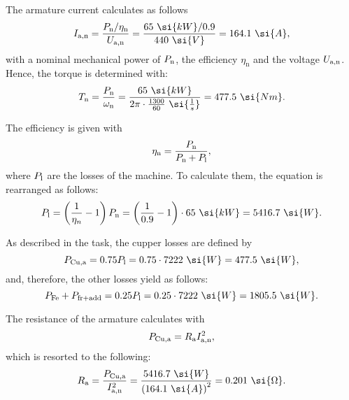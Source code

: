 \begin{solutionblock}
    The armature current calculates as follows
    \begin{equation}
        I_{\mathrm{a,n}} = \frac{\Pn / \eta_{\mathrm{n}}}{\Uan}
        = \frac{65 \ \si{kW} / 0.9}{440 \ \si{V}}
        = 164.1 \ \si{A},
    \end{equation}
    with a nominal mechanical power of $P_{\mathrm{n}}$, the efficiency $\eta_{\mathrm{n}}$ and the voltage $U_{\mathrm{a,n}}$.
    Hence, the torque is determined with:
    \begin{equation}
        \Tn = \frac{\Pn}{\omega_{\mathrm{n}}} 
        = \frac{65 \ \si{kW}}{2 \pi \cdot \frac{1300}{60} \ \si{\frac{1}{s}}}
        = 477.5 \ \si{Nm}.
    \end{equation}

    The efficiency is given with
    \begin{equation}
        \eta_{\mathrm{n}} = \frac{P_{\mathrm{n}}}{P_{\mathrm{n}} + P_{\mathrm{l}}},
    \end{equation}
    where $P_{\mathrm{l}}$ are the losses of the machine. To calculate them, the equation is rearranged as follows:
    \begin{equation}
        \Pl = \left(\frac{1}{\eta_{n}} - 1 \right) \Pn
        = \left(\frac{1}{0.9}-1 \right) \cdot 65\ \si{kW}
        = 5416.7 \ \si{W}.
    \end{equation}

    As described in the task, the cupper losses are defined by
    \begin{equation}
        P_{\mathrm{Cu,a}} = 0.75 \Pl
        = 0.75 \cdot 7222 \ \si{W} 
        = 477.5 \ \si{W},
    \end{equation}
    and, therefore, the other losses yield as follows:
    \begin{equation}
        P_{\mathrm{Fe}} + P_{\mathrm{fr + add}} = 0.25 \Pl 
        = 0.25 \cdot 7222 \ \si{W}
        = 1805.5 \ \si{W}.
    \end{equation}

    The resistance of the armature calculates with
    \begin{equation}
        P_{\mathrm{Cu,a}} = R_{\mathrm{a}} I_{\mathrm{a,n}}^{2},
    \end{equation}
    which is resorted to the following:
    \begin{equation}
        \Ra = \frac{P_{\mathrm{Cu,a}}}{I_{\mathrm{a,n}}^{2}}
        = \frac{5416.7 \ \si{W}}{\left(164.1 \ \si{A}\right)^2}
        = 0.201 \ \si{\Omega}.
    \end{equation}


\end{solutionblock}
